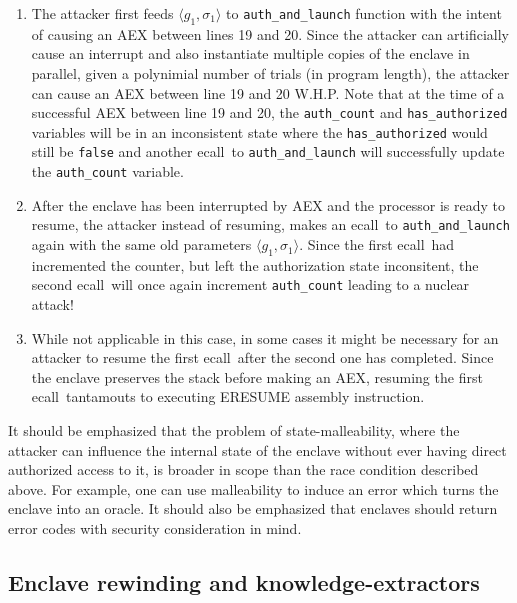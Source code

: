 \documentclass[10pt]{article}
\newcommand{\ecall}{\textsf{ecall}}
\begin{document}
  \begin{enumerate}
  \item The attacker first feeds $\langle g_1, \sigma_1 \rangle$ to
    \texttt{auth\_and\_launch} function with the intent of causing an
    AEX between lines 19 and 20. Since the attacker can artificially
    cause an interrupt and also instantiate multiple copies of the
    enclave in parallel, given a polynimial number of trials (in
    program length), the attacker can cause an AEX between line 19 and
    20 W.H.P. Note that at the time of a successful AEX between line
    19 and 20, the \texttt{auth\_count} and \texttt{has\_authorized}
    variables will be in an inconsistent state where the
    \texttt{has\_authorized} would still be \texttt{false} and another
    \ecall\ to \texttt{auth\_and\_launch} will successfully update the
    \texttt{auth\_count} variable.

  \item After the enclave has been interrupted by AEX and the
    processor is ready to resume, the attacker instead of resuming,
    makes an \ecall\ to \texttt{auth\_and\_launch} again with the same
    old parameters $\langle g_1, \sigma_1 \rangle$. Since the first
    \ecall\ had incremented the counter, but left the authorization
    state inconsitent, the second \ecall\ will once again increment
    \texttt{auth\_count} leading to a nuclear attack!

  \item While not applicable in this case, in some cases it might be
    necessary for an attacker to resume the first \ecall\ after the
    second one has completed. Since the enclave preserves the stack
    before making an AEX, resuming the first \ecall\ tantamouts to
    executing \textsf{ERESUME} assembly instruction.

  \end{enumerate}

  It should be emphasized that the problem of state-malleability,
  where the attacker can influence the internal state of the enclave
  without ever having direct authorized access to it, is broader in
  scope than the race condition described above. For example, one can
  use malleability to induce an error which turns the enclave into an
  oracle. It should also be emphasized that enclaves should return
  error codes with security consideration in mind.

  \subsection{Enclave rewinding and knowledge-extractors}
  \label{ssec:rewind}
\end{document}
